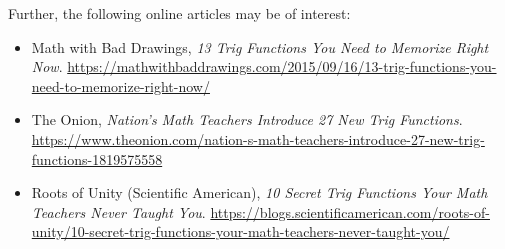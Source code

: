 \documentclass[a4paper,leqno]{article}
\numberwithin{equation}{section}
\theoremstyle{definition}
\theoremstyle{remark}
\begin{document}
Further, the following online articles may be of interest:
\begin{itemize}
  \item Math with Bad Drawings, \emph{13 Trig Functions You Need to Memorize Right Now}. \url{https://mathwithbaddrawings.com/2015/09/16/13-trig-functions-you-need-to-memorize-right-now/}
  \item The Onion, \emph{Nation's Math Teachers Introduce 27 New Trig Functions}. \url{https://www.theonion.com/nation-s-math-teachers-introduce-27-new-trig-functions-1819575558}
  \item Roots of Unity (Scientific American), \emph{10 Secret Trig Functions Your Math Teachers Never Taught You}. \url{https://blogs.scientificamerican.com/roots-of-unity/10-secret-trig-functions-your-math-teachers-never-taught-you/}
\end{itemize}
\end{document}
